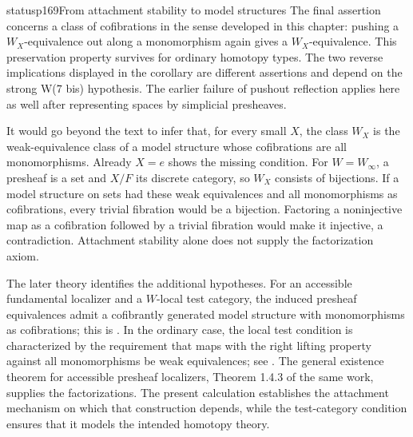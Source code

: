 \begin{dcomment}{status}{p169}{From attachment stability to model structures}
The final assertion concerns a class of cofibrations in the sense developed in this chapter: pushing a $W_X$-equivalence out along a monomorphism again gives a $W_X$-equivalence. This preservation property survives for ordinary homotopy types. The two reverse implications displayed in the corollary are different assertions and depend on the strong W(7 bis) hypothesis. The earlier failure of pushout reflection applies here as well after representing spaces by simplicial presheaves.

It would go beyond the text to infer that, for every small $X$, the class $W_X$ is the weak-equivalence class of a model structure whose cofibrations are all monomorphisms. Already $X=e$ shows the missing condition. For $W=W_\infty$, a presheaf is a set and $X/F$ its discrete category, so $W_X$ consists of bijections. If a model structure on sets had these weak equivalences and all monomorphisms as cofibrations, every trivial fibration would be a bijection. Factoring a noninjective map as a cofibration followed by a trivial fibration would make it injective, a contradiction. Attachment stability alone does not supply the factorization axiom.

The later theory identifies the additional hypotheses. For an accessible fundamental localizer and a $W$-local test category, the induced presheaf equivalences admit a cofibrantly generated model structure with monomorphisms as cofibrations; this is \citet[Corollary 4.2.18]{Cisinski2006}. In the ordinary case, the local test condition is characterized by the requirement that maps with the right lifting property against all monomorphisms be weak equivalences; see \citet[Theorem 4.1.19]{Cisinski2006}. The general existence theorem for accessible presheaf localizers, Theorem 1.4.3 of the same work, supplies the factorizations. The present calculation establishes the attachment mechanism on which that construction depends, while the test-category condition ensures that it models the intended homotopy theory.
\end{dcomment}
